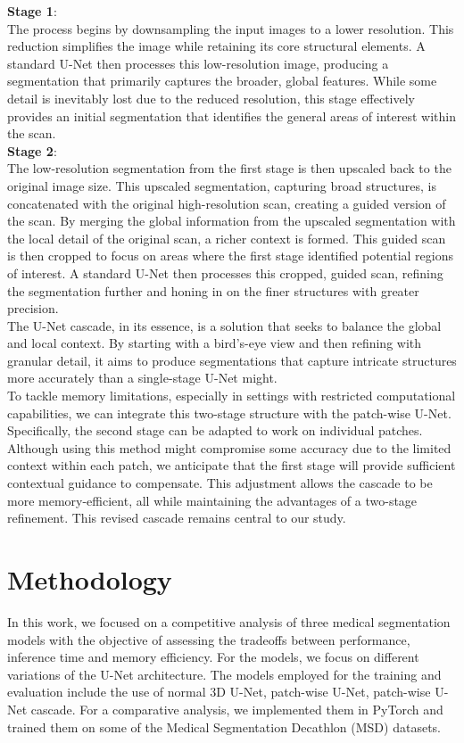 \noindent\textbf{Stage 1}:\\
The process begins by downsampling the input images to a lower resolution. This reduction simplifies the image while retaining its core structural elements.
A standard U-Net then processes this low-resolution image, producing a segmentation that primarily captures the broader, global features.
While some detail is inevitably lost due to the reduced resolution,
this stage effectively provides an initial segmentation that identifies the general areas of interest within the scan.\\[1ex]
\noindent\textbf{Stage 2}:\\
The low-resolution segmentation from the first stage is then upscaled back to the original image size. This upscaled segmentation, capturing broad structures,
is concatenated with the original high-resolution scan, creating a guided version of the scan.
By merging the global information from the upscaled segmentation with the local detail of the original scan, a richer context is formed.
This guided scan is then cropped to focus on areas where the first stage identified potential regions of interest.
A standard U-Net then processes this cropped, guided scan, refining the segmentation further and honing in on the finer structures with greater precision.\\[1ex]
The U-Net cascade, in its essence, is a solution that seeks to balance the global and local context.
By starting with a bird's-eye view and then refining with granular detail, it aims to produce segmentations that capture intricate structures more accurately than a single-stage U-Net might.\\[1ex]
To tackle memory limitations, especially in settings with restricted computational capabilities, we can integrate this two-stage structure with the patch-wise U-Net.
Specifically, the second stage can be adapted to work on individual patches.
Although using this method might compromise some accuracy due to the limited context within each patch,
we anticipate that the first stage will provide sufficient contextual guidance to compensate. This adjustment allows the cascade to be more memory-efficient,
all while maintaining the advantages of a two-stage refinement. This revised cascade remains central to our study.

\chapter{Methodology}
In this work, we focused on a competitive analysis of three medical segmentation models with the objective of assessing the tradeoffs between performance, inference time and memory efficiency.
For the models, we focus on different variations of the U-Net architecture. The models employed for the training and evaluation include the use of normal $3$D U-Net, patch-wise U-Net,
patch-wise U-Net cascade. For a comparative analysis, we implemented them in PyTorch and trained them on some of the Medical Segmentation Decathlon (MSD) datasets.\\

